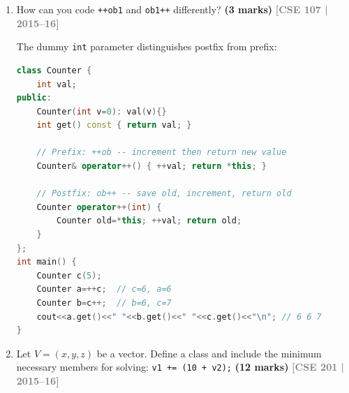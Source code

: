 \documentclass[12pt,a3paper]{article}
\newcommand{\yr}[1]{\hfill\textcolor{gray}{\small\textbf{[#1]}}}
\newcommand{\mk}[1]{\textcolor{orange!70!black}{\small\textbf{(#1 marks)}}}
\begin{document}
\begin{enumerate}
\begin{tcolorbox}[enhanced,breakable,ansbox,colback=cF!4,colframe=cF,
  boxrule=0.8pt,arc=5pt,
  title={\textbf{Answer --- MyInt --- overload +, * (both sides), =}},
  fonttitle=\bfseries\color{white},colbacktitle=cF]
\begin{lstlisting}[language=C++]
    MyInt operator+(const MyInt& o) const { return MyInt(*x+*o.x); }
    MyInt operator*(int n)          const { return MyInt(*x*n); }
    friend MyInt operator*(int n, const MyInt& m){ return MyInt(n**m.x); }
    MyInt& operator=(const MyInt& o){ if(this!=&o) *x=*o.x; return *this; }
};
int main(){
    MyInt m1(5), m2(3);
    cout<<(m1+m2).getX()<<"\n"; // 8
    cout<<(m1*4).getX()  <<"\n"; // 20
    cout<<(3*m2).getX()  <<"\n"; // 9
}
\end{lstlisting}

\end{tcolorbox}


\item How can you code \texttt{++ob1} and \texttt{ob1++} differently? \mk{3}
\yr{CSE 107 | 2015--16}

\begin{tcolorbox}[enhanced,breakable,ansbox,colback=cF!4,colframe=cF,
  boxrule=0.8pt,arc=5pt,
  title={\textbf{Answer --- How to code ++ob (prefix) and ob++ (postfix) differently}},
  fonttitle=\bfseries\color{white},colbacktitle=cF]

The dummy \texttt{int} parameter distinguishes postfix from prefix:

\begin{lstlisting}[language=C++]
class Counter {
    int val;
public:
    Counter(int v=0): val(v){}
    int get() const { return val; }

    // Prefix: ++ob -- increment then return new value
    Counter& operator++() { ++val; return *this; }

    // Postfix: ob++ -- save old, increment, return old
    Counter operator++(int) {
        Counter old=*this; ++val; return old;
    }
};
int main() {
    Counter c(5);
    Counter a=++c;  // c=6, a=6
    Counter b=c++;  // b=6, c=7
    cout<<a.get()<<" "<<b.get()<<" "<<c.get()<<"\n"; // 6 6 7
}
\end{lstlisting}

\end{tcolorbox}

\item Let $V = (x, y, z)$ be a vector. Define a class and include the minimum necessary members for solving: \texttt{v1 += (10 + v2);} \mk{12}
\yr{CSE 201 | 2015--16}


\begin{tcolorbox}[enhanced,breakable,ansbox,colback=cF!4,colframe=cF,
  boxrule=0.8pt,arc=5pt,
  title={\textbf{Answer --- Vector class for v1 += (10 + v2)}},
  fonttitle=\bfseries\color{white},colbacktitle=cF]


\end{tcolorbox}
\end{enumerate}
\end{document}
